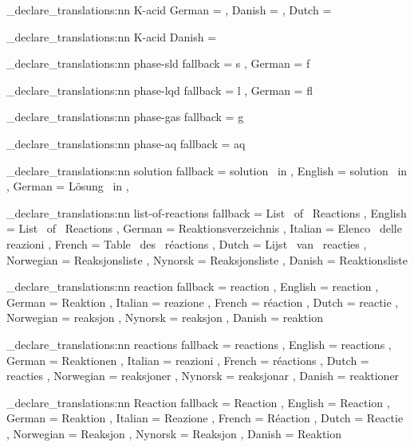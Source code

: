 
\chemmacros_declare_translations:nn {K-acid}
  {
    German =  ,
    Danish =  ,
    Dutch  = 
  }

\chemmacros_declare_translations:nn {K-acid}
  { Danish =  }

\chemmacros_declare_translations:nn {phase-sld}
  {
    fallback = s ,
    German   = f
  }

\chemmacros_declare_translations:nn {phase-lqd}
  {
    fallback = l ,
    German   = f\/l
  }

\chemmacros_declare_translations:nn {phase-gas}
  { fallback = g }

\chemmacros_declare_translations:nn {phase-aq}
  { fallback = aq }

\chemmacros_declare_translations:nn {solution}
  {
    fallback = solution~ in ,
    English  = solution~ in ,
    German   = L\"osung~ in ,
  }

\chemmacros_declare_translations:nn {list-of-reactions}
  {
    fallback  = List~ of~ Reactions ,
    English   = List~ of~ Reactions ,
    German    = Reaktionsverzeichnis ,
    Italian   = Elenco~ delle~ reazioni ,
    French    = Table~ des~ r\'{e}actions ,
    Dutch     = Lijst~ van~ reacties ,
    Norwegian = Reaksjonsliste ,
    Nynorsk   = Reaksjonsliste ,
    Danish    = Reaktionsliste
  }

\chemmacros_declare_translations:nn {reaction}
  {
    fallback  = reaction ,
    English   = reaction ,
    German    = Reaktion ,
    Italian   = reazione ,
    French    = r\'{e}action ,
    Dutch     = reactie ,
    Norwegian = reaksjon ,
    Nynorsk   = reaksjon ,
    Danish    = reaktion
  }

\chemmacros_declare_translations:nn {reactions}
  {
    fallback  = reactions ,
    English   = reactions ,
    German    = Reaktionen ,
    Italian   = reazioni ,
    French    = r\'{e}actions ,
    Dutch     = reacties ,
    Norwegian = reaksjoner ,
    Nynorsk   = reaksjonar ,
    Danish    = reaktioner
  }

\chemmacros_declare_translations:nn {Reaction}
  {
    fallback  = Reaction ,
    English   = Reaction ,
    German    = Reaktion ,
    Italian   = Reazione ,
    French    = R\'{e}action ,
    Dutch     = Reactie ,
    Norwegian = Reaksjon ,
    Nynorsk   = Reaksjon ,
    Danish    = Reaktion
  }

